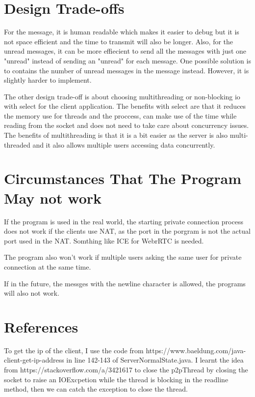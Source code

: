 \documentclass[10pt]{article}
\begin{document}
\section*{Design Trade-offs}
For the message, it is human readable which makes it easier to debug but it is not space efficient and the time to transmit will also be longer. Also, for the unread messages, it can be more effiecient to send all the messages with just one "unread" instead of sending an "unread" for each message. One possible solution is to contains the number of unread messages in the message instead. However, it is slightly harder to implement.

The other design trade-off is about choosing multithreading or non-blocking io with select for the client application. The benefits with select are that it reduces the memory use for threads and the proccess, can make use of the time while reading from the socket and does not need to take care about concurrency issues. The benefits of multithreading is that it is a bit easier as the server is also multi-threaded and it also allows multiple users accessing data concurrently.
\section*{Circumstances That The Program May not work}
If the program is used in the real world, the starting private connection process does not work if the clients use NAT, as the port in the porgram is not the actual port used in the NAT. Somthing like ICE for WebrRTC is needed.

The program also won't work if multiple users asking the same user for private connection at the same time.

If in the future, the messges with the newline character is allowed, the programs will also not work.
\section*{References}
To get the ip of the client, I use the code from https://www.baeldung.com/java-client-get-ip-address in line 142-143 of ServerNormalState.java. I learnt the idea from
https://stackoverflow.com/a/3421617 to close the p2pThread by closing the socket to raise an IOExcpetion while the thread is blocking in the readline method, then we can catch the exception to close the thread.
\end{document}
